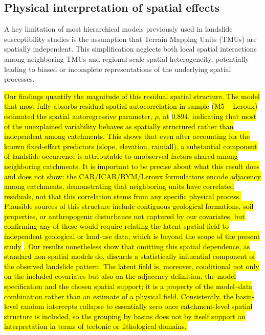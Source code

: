 \documentclass[journal abbreviation, manuscript]{copernicus}
\newcommand{\hlE}[1]{{\sethlcolor{edcyan}\hl{#1}}}
\begin{document}
\subsection{Physical interpretation of spatial effects}\label{subsec52}

A key limitation of most hierarchical models previously used in landslide susceptibility studies is the assumption that Terrain Mapping Units (TMUs) are spatially independent. 
This simplification neglects both local spatial interactions among neighboring TMUs and regional-scale spatial heterogeneity, potentially leading to biased or incomplete representations of the underlying spatial processes.

\hl{Our findings quantify the magnitude of this residual spatial structure. 
The model} \hlE{that most fully absorbs residual spatial autocorrelation in-sample} \hl{(M5 -- Leroux) estimated the spatial autoregressive parameter, $\rho$, at }\hlE{0.894}\hl{, indicating that most of the unexplained variability behaves as spatially structured rather than independent among catchments. 
This shows that even after accounting for the known fixed-effect predictors (slope, elevation, rainfall), a substantial component of landslide occurrence is attributable to unobserved factors shared among neighboring catchments. 
It is important to be precise about what this result does and does not show: the CAR/ICAR/BYM/Leroux formulations encode adjacency among catchments, demonstrating that neighboring units have correlated residuals, not that this correlation stems from any specific physical process. 
Plausible sources of this structure include contiguous geological formations, soil properties, or anthropogenic disturbance not captured by our covariates, but confirming any of these would require relating the latent spatial field to independent geological or land-use data, which is beyond the scope of the present study} \citep{besag1991bayesian, lawson2018bayesian, morris2019bayesian}
\hlE{. Our results nonetheless show that omitting this spatial dependence, as standard non-spatial models do, discards a statistically influential component of the observed landslide pattern. The latent field is, moreover, conditional not only on the included covariates but also on the adjacency definition, the model specification and the chosen spatial support; it is a property of the model--data combination rather than an estimate of a physical field. Consistently, the basin-level random intercepts collapse to essentially zero once catchment-level spatial structure is included, so the grouping by basins does not by itself support an interpretation in terms of tectonic or lithological domains.}
\end{document}
